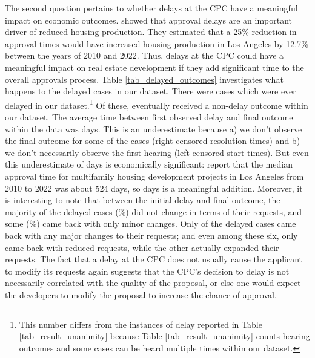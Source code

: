 The second question pertains to whether delays at the CPC have a meaningful impact on economic outcomes. \citet{gabrielkung2025} showed that approval delays are an important driver of reduced housing production. They estimated that a 25\% reduction in approval times would have increased housing production in Los Angeles by 12.7\% between the years of 2010 and 2022. Thus, delays at the CPC could have a meaningful impact on real estate development if they add significant time to the overall approvals process. Table \ref{tab_delayed_outcomes} investigates what happens to the delayed cases in our dataset. There were  cases which were ever delayed in our dataset.\footnote{This number differs from the  instances of delay reported in Table \ref{tab_result_unanimity} because Table \ref{tab_result_unanimity} counts hearing outcomes and some cases can be heard multiple times within our dataset.} Of these,  eventually received a non-delay outcome within our dataset. The average time between first observed delay and final outcome within the data was  days. This is an underestimate because a) we don't observe the final outcome for some of the cases (right-censored resolution times) and b) we don't necessarily observe the first hearing (left-censored start times). But even this underestimate of  days is economically significant: \citet{gabrielkung2025} report that the median approval time for multifamily housing development projects in Los Angeles from 2010 to 2022 was about 524 days, so  days is a meaningful addition. Moreover, it is interesting to note that between the initial delay and final outcome, the majority of the delayed cases (\%) did not change in terms of their requests, and some (\%) came back with only minor changes. Only  of the delayed cases came back with any major changes to their requests; and even among these six, only  came back with reduced requests, while the other  actually expanded their requests. The fact that a delay at the CPC does not usually cause the applicant to modify its requests again suggests that the CPC's decision to delay is not necessarily correlated with the quality of the proposal, or else one would expect the developers to modify the proposal to increase the chance of approval.
